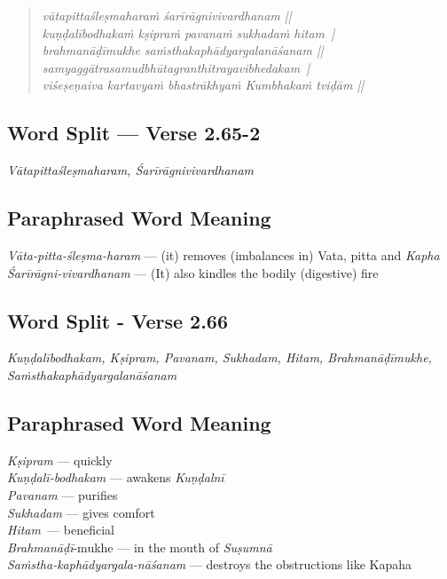 \begin{verse}
\textit{vātapittaśleṣmaharaṁ śarīrāgnivivardhanam ||\\
kuṇḍalībodhakaṁ kṣipraṁ pavanaṁ sukhadaṁ hitam |\\
brahmanāḍīmukhe saṁsthakaphādyargalanāśanam ||\\
samyaggātrasamudbhūtagranthitrayavibhedakam |\\
viśeṣeṇaiva kartavyaṁ bhastrākhyaṁ Kumbhakaṁ tviḍām ||}
\end{verse}

\subsection*{Word Split --- Verse 2.65-2}


\textit{Vātapittaśleṣmaharam, Śarīrāgnivivardhanam}

\subsection*{Paraphrased Word Meaning}


\begin{multicols}{2}
\textit{Vāta-pitta-śleṣma-haram }--- (it) removes (imbalances in) Vata, pitta and \textit{Kapha}\\
\textit{Śarīrāgni-vivardhanam} --- (It) also kindles the bodily (digestive) fire
\end{multicols}

\subsection*{Word Split - Verse 2.66}


\textit{Kuṇḍalībodhakam, Kṣipram, Pavanam, Sukhadam, Hitam, Brahmanāḍīmukhe, Saṁsthakaphādyargalanāśanam}

\subsection*{Paraphrased Word Meaning}


\begin{multicols}{2}
\textit{Kṣipram} --- quickly \\
\textit{Kuṇḍalī-bodhakam} --- awakens \textit{Kuṇḍalnī}\\
\textit{Pavanam} --- purifies \\
\textit{Sukhadam} --- gives comfort \\
\textit{Hitam }--- beneficial\\
\textit{Brahmanāḍī}-mukhe --- in the mouth of \textit{Suṣumnā}\\
\textit{Saṁstha-kaphādyargala-nāśanam} --- destroys the obstructions like Kapaha
\end{multicols}

